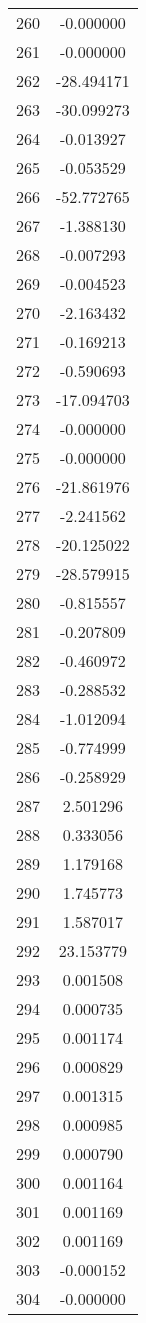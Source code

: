 \documentclass[12pt]{article}
\begin{document}
\begin{longtable}{@{}cc@{}}
260 & -0.000000 \\
261 & -0.000000 \\
262 & -28.494171 \\
263 & -30.099273 \\
264 & -0.013927 \\
265 & -0.053529 \\
266 & -52.772765 \\
267 & -1.388130 \\
268 & -0.007293 \\
269 & -0.004523 \\
270 & -2.163432 \\
271 & -0.169213 \\
272 & -0.590693 \\
273 & -17.094703 \\
274 & -0.000000 \\
275 & -0.000000 \\
276 & -21.861976 \\
277 & -2.241562 \\
278 & -20.125022 \\
279 & -28.579915 \\
280 & -0.815557 \\
281 & -0.207809 \\
282 & -0.460972 \\
283 & -0.288532 \\
284 & -1.012094 \\
285 & -0.774999 \\
286 & -0.258929 \\
287 & 2.501296 \\
288 & 0.333056 \\
289 & 1.179168 \\
290 & 1.745773 \\
291 & 1.587017 \\
292 & 23.153779 \\
293 & 0.001508 \\
294 & 0.000735 \\
295 & 0.001174 \\
296 & 0.000829 \\
297 & 0.001315 \\
298 & 0.000985 \\
299 & 0.000790 \\
300 & 0.001164 \\
301 & 0.001169 \\
302 & 0.001169 \\
303 & -0.000152 \\
304 & -0.000000 \\

\end{longtable}
\end{document}
